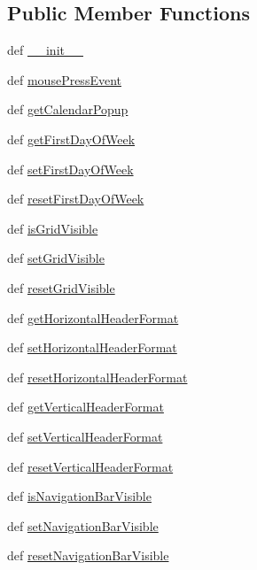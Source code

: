 \subsection*{Public Member Functions}
\begin{DoxyCompactItemize}
\item 
def \hyperlink{classdatetimeedit_1_1PyDateTimeEdit_a230d8852736193b147310dc187aaf9c9}{\+\_\+\+\_\+init\+\_\+\+\_\+}
\item 
def \hyperlink{classdatetimeedit_1_1PyDateTimeEdit_a251f01f60725586e6e92c451e26ad069}{mouse\+Press\+Event}
\item 
def \hyperlink{classdatetimeedit_1_1PyDateTimeEdit_a33d3e558b52debc42d5d8333c7e01d58}{get\+Calendar\+Popup}
\item 
def \hyperlink{classdatetimeedit_1_1PyDateTimeEdit_a30618d8b04306086396f4d7b7b9c532a}{get\+First\+Day\+Of\+Week}
\item 
def \hyperlink{classdatetimeedit_1_1PyDateTimeEdit_a4d0f5e3946bd43c20a4b5d603f6501a7}{set\+First\+Day\+Of\+Week}
\item 
def \hyperlink{classdatetimeedit_1_1PyDateTimeEdit_a8952eb0989042e3c1e9695e17bcd8e1b}{reset\+First\+Day\+Of\+Week}
\item 
def \hyperlink{classdatetimeedit_1_1PyDateTimeEdit_a17a905076f703a6f5be7ec23fee368de}{is\+Grid\+Visible}
\item 
def \hyperlink{classdatetimeedit_1_1PyDateTimeEdit_a59735d9fa0273312084887037450d1b2}{set\+Grid\+Visible}
\item 
def \hyperlink{classdatetimeedit_1_1PyDateTimeEdit_aad88bb5be4008aa732b687f44e921973}{reset\+Grid\+Visible}
\item 
def \hyperlink{classdatetimeedit_1_1PyDateTimeEdit_a44a73df3197d6328e216f7f6ab99934d}{get\+Horizontal\+Header\+Format}
\item 
def \hyperlink{classdatetimeedit_1_1PyDateTimeEdit_a7666827a015d41fa82d86a9e18ab644f}{set\+Horizontal\+Header\+Format}
\item 
def \hyperlink{classdatetimeedit_1_1PyDateTimeEdit_af5cea961f4778c7224184b1ab64ce0c0}{reset\+Horizontal\+Header\+Format}
\item 
def \hyperlink{classdatetimeedit_1_1PyDateTimeEdit_aefbc9e5244d2f55d25682591a7dfe1a9}{get\+Vertical\+Header\+Format}
\item 
def \hyperlink{classdatetimeedit_1_1PyDateTimeEdit_a2c90326c6bfc2d300937d39bab1c9167}{set\+Vertical\+Header\+Format}
\item 
def \hyperlink{classdatetimeedit_1_1PyDateTimeEdit_af834678f174724b4f2e1970a20143125}{reset\+Vertical\+Header\+Format}
\item 
def \hyperlink{classdatetimeedit_1_1PyDateTimeEdit_a427a2fba11590723af2e946c0e34b7a5}{is\+Navigation\+Bar\+Visible}
\item 
def \hyperlink{classdatetimeedit_1_1PyDateTimeEdit_a57501532976fcc23df8841f48e4fcf72}{set\+Navigation\+Bar\+Visible}
\item 
def \hyperlink{classdatetimeedit_1_1PyDateTimeEdit_afa5b82b5134e2adf6dd93f9aa1c6c251}{reset\+Navigation\+Bar\+Visible}
\end{DoxyCompactItemize}
